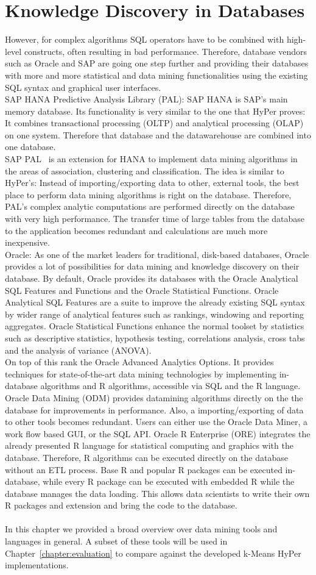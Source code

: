 \section{Knowledge Discovery in Databases}
However, for complex algorithms SQL operators have to be combined with high-level constructs, often resulting in bad performance. Therefore, database vendors such as Oracle and SAP are going one step further and providing their databases with more and more statistical and data mining functionalities using the existing SQL syntax and graphical user interfaces.
\\
SAP HANA Predictive Analysis Library (PAL): SAP HANA is SAP's main memory database. Its functionality is very similar to the one that HyPer proves: It combines transactional processing (OLTP) and analytical processing (OLAP) on one system. Therefore that database and the datawarehouse are combined into one database. 
\\
SAP PAL~\parencite{pal} is an extension for HANA to implement data mining algorithms in the areas of association, clustering and classification. The idea is similar to HyPer's: Instead of importing/exporting data to other, external tools, the best place to perform data mining algorithms is right on the database. Therefore, PAL's complex analytic computations are performed directly on the database with very high performance. The transfer time of large tables from the database to the application becomes redundant and calculations are much more inexpensive.
\\
Oracle: As one of the market leaders for traditional, disk-based databases, Oracle provides a lot of possibilities for data mining and knowledge discovery on their database. By default, Oracle provides its databases with the Oracle Analytical SQL Features and Functions and the Oracle Statistical Functions. Oracle Analytical SQL Features are a suite to improve the already existing SQL syntax by wider range of analytical features such as rankings, windowing and reporting aggregates. Oracle Statistical Functions enhance the normal toolset by statistics such as descriptive statistics, hypothesis testing, correlations analysis, cross tabs and the analysis of variance (ANOVA). 
\\
On top of this rank the Oracle Advanced Analytics Options. It provides techniques for state-of-the-art data mining technologies by implementing in-database algorithms and R algorithms, accessible via SQL and the R language. Oracle Data Mining (ODM) provides datamining algorithms directly on the the database for improvements in performance. Also, a importing/exporting of data to other tools becomes redundant. Users can either use the Oracle Data Miner, a work flow based GUI, or the SQL API. Oracle R Enterprise (ORE) integrates the already presented R language for statistical computing and graphics with the database. Therefore, R algorithms can be executed directly on the database without an ETL process. Base R and popular R packages can be executed in-database, while every R package can be executed with embedded R while the database manages the data loading. This allows data scientists to write their own R packages and extension and bring the code to the database.
\\
\\
In this chapter we provided a broad overview over data mining tools and languages in general. A subset of these tools will be used in Chapter~\ref{chapter:evaluation} to compare against the developed k-Means HyPer implementations.

